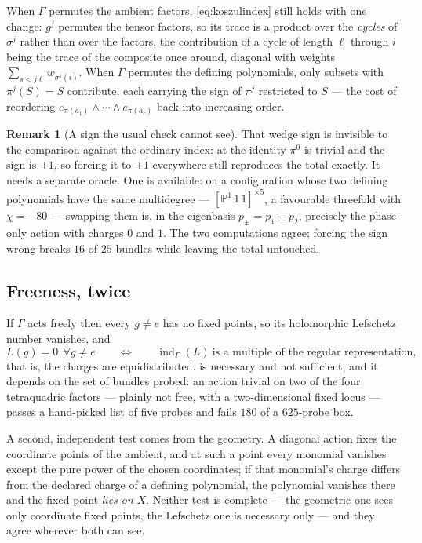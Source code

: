 \documentclass[11pt,a4paper]{article}
\newcommand{\PP}{\mathbb{P}}
\theoremstyle{definition}
\newtheorem{remark}{Remark}
\begin{document}
When $\Gamma$ permutes the ambient factors, \cref{eq:koszulindex} still holds
with one change: $g^j$ permutes the tensor factors, so its trace is a product
over the \emph{cycles} of $\sigma^j$ rather than over the factors, the
contribution of a cycle of length $\ell$ through $i$ being the trace of the
composite once around, diagonal with weights $\sum_{s<j\ell} w_{\sigma^s(i)}$.
When $\Gamma$ permutes the defining polynomials, only subsets with
$\pi^j(S) = S$ contribute, each carrying the sign of $\pi^j$ restricted to $S$
--- the cost of reordering $e_{\pi(a_1)} \wedge \cdots \wedge e_{\pi(a_r)}$
back into increasing order.

\begin{remark}[A sign the usual check cannot see]
That wedge sign is invisible to the comparison against the ordinary index:
at the identity $\pi^0$ is trivial and the sign is $+1$, so forcing it to
$+1$ everywhere still reproduces the total exactly. It needs a separate
oracle. One is available: on a configuration whose two defining polynomials
have the same multidegree --- $[\PP^1\,1\,1]^{\times 5}$, a favourable
threefold with $\chi = -80$ --- swapping them is, in the eigenbasis
$p_\pm = p_1 \pm p_2$, precisely the phase-only action with charges $0$ and
$1$. The two computations agree; forcing the sign wrong breaks $16$ of $25$
bundles while leaving the total untouched.
\end{remark}

\subsection{Freeness, twice}

If $\Gamma$ acts freely then every $g \neq e$ has no fixed points, so its
holomorphic Lefschetz number vanishes, and
%
\begin{equation}
L(g) = 0 \ \ \forall g \neq e
\qquad\Longleftrightarrow\qquad
\operatorname{ind}_\Gamma(L) \ \text{is a multiple of the regular
representation,}
\label{eq:lefschetzfree}
\end{equation}
%
that is, the charges are equidistributed.  is necessary
and not sufficient, and it depends on the set of bundles probed: an action
trivial on two of the four tetraquadric factors --- plainly not free, with a
two-dimensional fixed locus --- passes a hand-picked list of five probes and
fails $180$ of a $625$-probe box.

A second, independent test comes from the geometry. A diagonal action fixes
the coordinate points of the ambient, and at such a point every monomial
vanishes except the pure power of the chosen coordinates; if that monomial's
charge differs from the declared charge of a defining polynomial, the
polynomial vanishes there and the fixed point \emph{lies on} $X$. Neither test
is complete --- the geometric one sees only coordinate fixed points, the
Lefschetz one is necessary only --- and they agree wherever both can see.
\end{document}
